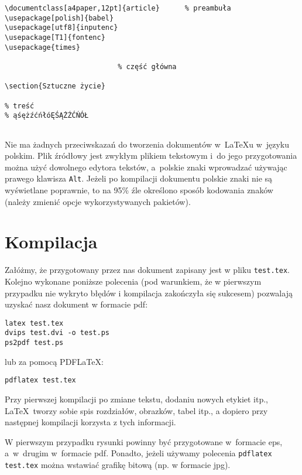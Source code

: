\begin{lstlisting}
\documentclass[a4paper,12pt]{article}      % preambuła
\usepackage[polish]{babel}
\usepackage[utf8]{inputenc}
\usepackage[T1]{fontenc}
\usepackage{times}

                           % część główna

\section{Sztuczne życie}

% treść
% ąśężźćńłóĘŚĄŻŹĆŃÓŁ


\end{lstlisting}

Nie ma żadnych przeciwskazań do tworzenia dokumentów w~\LaTeX u w~języku polskim. Plik źródłowy jest zwykłym plikiem tekstowym i~do jego przygotowania można użyć dowolnego edytora tekstów, a~polskie znaki wprowadzać używając prawego klawisza \texttt{Alt}. Jeżeli po kompilacji dokumentu polskie znaki nie są wyświetlane poprawnie, to na 95\% źle określono sposób kodowania znaków (należy zmienić opcje wykorzystywanych pakietów).



\section{Kompilacja}
\label{sec:kompilacja}


Załóżmy, że przygotowany przez nas dokument zapisany jest w pliku \texttt{test.tex}. Kolejno wykonane poniższe polecenia (pod warunkiem, że w pierwszym przypadku nie wykryto błędów i kompilacja zakończyła się sukcesem) pozwalają uzyskać nasz dokument w formacie pdf:
\begin{lstlisting}
latex test.tex
dvips test.dvi -o test.ps
ps2pdf test.ps
\end{lstlisting}
%
lub za pomocą PDF\LaTeX:
\begin{lstlisting}
pdflatex test.tex
\end{lstlisting}

Przy pierwszej kompilacji po zmiane tekstu, dodaniu nowych etykiet itp., \LaTeX~tworzy sobie spis rozdziałów, obrazków, tabel itp., a dopiero przy następnej kompilacji korzysta z tych informacji.

W pierwszym przypadku rysunki powinny być przygotowane w~formacie eps, a~w~drugim w~formacie pdf. Ponadto, jeżeli używamy polecenia \texttt{pdflatex test.tex} można wstawiać grafikę bitową (np. w formacie jpg).



